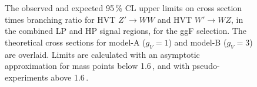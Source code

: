 \begin{figure}[H]
\centering
{}\\
\\
\caption[Observed and expected upper limits for HVT $Z'$ and $W'$ model (gluon-gluon fusion selection)]{The observed and expected 95\,\% CL upper limits on cross section times branching ratio for \protect{} HVT $Z' \rightarrow WW$ and \protect{} HVT $W' \rightarrow WZ$, in the combined LP and HP signal regions, for the ggF selection. The theoretical cross sections for model-A ($g_V=1$) and model-B ($g_V=3$) are overlaid. Limits are calculated with an asymptotic approximation for mass points below 1.6\,\TeV, and with pseudo-experiments above 1.6\,\TeV.}
\label{fig:lim_HVT}
\end{figure}
